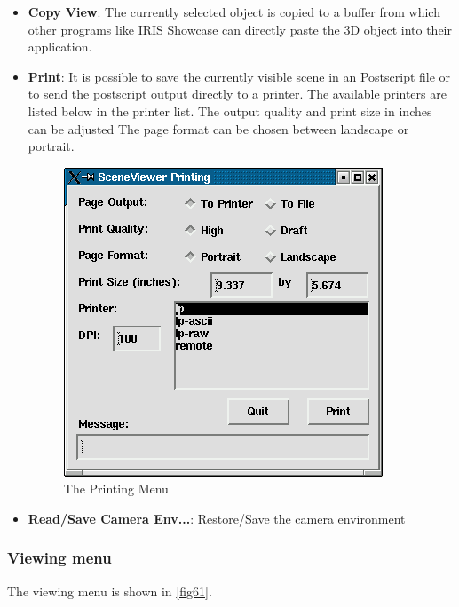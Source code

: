 \begin{itemize}
\item {\bf Copy View}: The currently selected object is copied to a buffer from which other programs
like IRIS Showcase can directly paste the 3D object into their application. 

\item {\bf Print}: It is possible to save the currently visible scene in an Postscript file or to
send the postscript output directly to a printer. The available printers are
listed below in the printer list. The output quality and print size in inches
can be adjusted The page format can be chosen between landscape or portrait.

 \latexonly
 \begin{figure}[htp]
  \begin{center}
   \includegraphics[scale=0.7]{renderer/pict/image14}
   \caption{The Printing Menu}
	\label{fig60}
  \end{center}
 \end{figure}
 \endlatexonly

\item{\bf Read/Save Camera Env...}: Restore/Save the camera environment

\end{itemize}
\clearpage

\subsubsection{Viewing menu}

The viewing menu is shown in \ref{fig61}.

